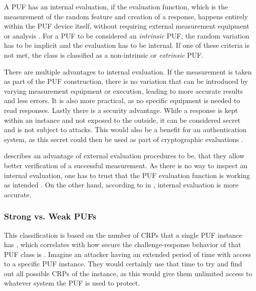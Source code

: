 A PUF has an internal evaluation, if the evaluation function, which is the measurement of the random feature
and creation of a response, happens entirely within the PUF device itself, without requiring external
measurement equipment or analysis \cite[][p. 23f]{Maes2013}.
For a PUF to be considered an \emph{intrinsic} PUF, the random variation has to be implicit and the evaluation has to be internal.
If one of these criteria is not met, the class is classified as a non-intrinsic or \emph{extrinsic} PUF. \cite[][p. 3]{McGrath2019}

There are multiple advantages to internal evaluation.
If the measurement is taken as part of the PUF construction, there is no variation that can be introduced
by varying measurement equipment or execution, leading to more accurate results and less errors.
It is also more practical, as no specific equipment is needed to read responses.
Lastly there is a security advantage. While a response is kept within an instance and not exposed to the outside,
it can be considered secret and is not subject to attacks.
This would also be a benefit for an authentication system, as this secret could
then be used as part of cryptographic evaluations .\cite[][p. 23f]{Maes2013} \cite[][p. 3]{McGrath2019}

\citeauthor{Maes2013} describes an advantage of external evaluation procedures to be, that they allow better verification of a successful measurement.
As there is no way to inspect an internal evaluation, one has to trust that the PUF evaluation function is working as intended \cite[][p. 24]{Maes2013}.
On the other hand, according to \citeauthor*{McGrath2019} in \cite{McGrath2019}, internal evaluation is more accurate.



\subsubsection{Strong vs. Weak PUFs}
\label{sec:strong_weak_pufs}

This classification is based on the number of \acp{CRP} that a single PUF instance has \cite[][p. 2]{McGrath2019},
which correlates with how secure the challenge-response behavior of that PUF class is \cite[][p.25]{Maes2013}.
Imagine an attacker having an extended period of time with access to a specific PUF instance.
They would certainly use that time to try and find out all possible \acp{CRP} of the instance, as this
would give them unlimited access to whatever system the PUF is used to protect. \cite[][p.25]{Maes2013}

